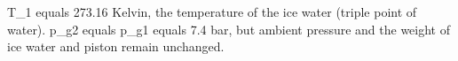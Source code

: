 T_1 equals 273.16 Kelvin, the temperature of the ice water (triple point of water).  
p_g2 equals p_g1 equals 7.4 bar, but ambient pressure and the weight of ice water and piston remain unchanged.